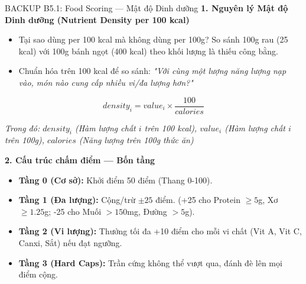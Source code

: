 \documentclass[10pt, aspectratio=169]{beamer}
\begin{document}
\begin{frame}[label=b5_1]{BACKUP B5.1: Food Scoring — Mật độ Dinh dưỡng}
\hypertarget{b5_1_target}{}
    \textbf{1. Nguyên lý Mật độ Dinh dưỡng (Nutrient Density per 100 kcal)}
    \begin{itemize}
        \small
        \item Tại sao dùng per 100 kcal mà không dùng per 100g? So sánh 100g rau (25 kcal) với 100g bánh ngọt (400 kcal) theo khối lượng là thiếu công bằng.
        \item Chuẩn hóa trên 100 kcal để so sánh: \textit{"Với cùng một lượng năng lượng nạp vào, món nào cung cấp nhiều vi/đa lượng hơn?"}
    \end{itemize}
    
    $$ density_i = value_i \times \frac{100}{calories} $$
    \vspace{-0.2cm}
    \begin{center}
        \scriptsize \textit{Trong đó: $density_i$ (Hàm lượng chất $i$ trên 100 kcal), $value_i$ (Hàm lượng chất $i$ trên 100g), $calories$ (Năng lượng trên 100g thức ăn)}
    \end{center}
    
    \vspace{0.2cm}
    \textbf{2. Cấu trúc chấm điểm — Bốn tầng}
    \begin{itemize}
        \small
        \item \textbf{Tầng 0 (Cơ sở):} Khởi điểm 50 điểm (Thang 0-100).
        \item \textbf{Tầng 1 (Đa lượng):} Cộng/trừ $\pm 25$ điểm. (+25 cho Protein $\ge 5$g, Xơ $\ge 1.25$g; -25 cho Muối $>150$mg, Đường $>5$g).
        \item \textbf{Tầng 2 (Vi lượng):} Thưởng tối đa +10 điểm cho mỗi vi chất (Vit A, Vit C, Canxi, Sắt) nếu đạt ngưỡng.
        \item \textbf{Tầng 3 (Hard Caps):} Trần cứng không thể vượt qua, đánh đè lên mọi điểm cộng.
    \end{itemize}
\end{frame}
\end{document}
